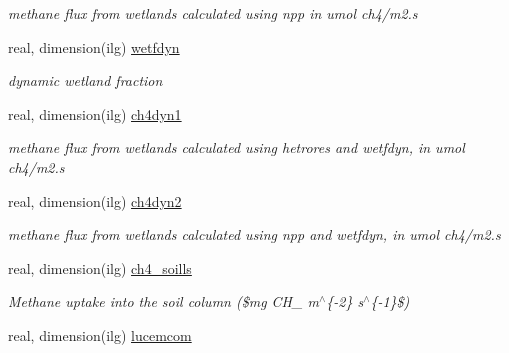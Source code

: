 \begin{DoxyCompactItemize}
\begin{DoxyCompactList}\small\item\em methane flux from wetlands calculated using npp in umol ch4/m2.\+s \end{DoxyCompactList}\item 
\hypertarget{structctem__statevars_1_1veg__gat_aa371d75a56d8a9e4ae250ffab7cff1df}{}real, dimension(ilg) \hyperlink{structctem__statevars_1_1veg__gat_aa371d75a56d8a9e4ae250ffab7cff1df}{wetfdyn}\label{structctem__statevars_1_1veg__gat_aa371d75a56d8a9e4ae250ffab7cff1df}

\begin{DoxyCompactList}\small\item\em dynamic wetland fraction \end{DoxyCompactList}\item 
\hypertarget{structctem__statevars_1_1veg__gat_a2c95c640b44e0e3afd10638454ab032c}{}real, dimension(ilg) \hyperlink{structctem__statevars_1_1veg__gat_a2c95c640b44e0e3afd10638454ab032c}{ch4dyn1}\label{structctem__statevars_1_1veg__gat_a2c95c640b44e0e3afd10638454ab032c}

\begin{DoxyCompactList}\small\item\em methane flux from wetlands calculated using hetrores and wetfdyn, in umol ch4/m2.\+s \end{DoxyCompactList}\item 
\hypertarget{structctem__statevars_1_1veg__gat_a8ab31a0dda091dc520aa8894a1862e3c}{}real, dimension(ilg) \hyperlink{structctem__statevars_1_1veg__gat_a8ab31a0dda091dc520aa8894a1862e3c}{ch4dyn2}\label{structctem__statevars_1_1veg__gat_a8ab31a0dda091dc520aa8894a1862e3c}

\begin{DoxyCompactList}\small\item\em methane flux from wetlands calculated using npp and wetfdyn, in umol ch4/m2.\+s \end{DoxyCompactList}\item 
\hypertarget{structctem__statevars_1_1veg__gat_a259374843ce099eaf59dc64b6382f12f}{}real, dimension(ilg) \hyperlink{structctem__statevars_1_1veg__gat_a259374843ce099eaf59dc64b6382f12f}{ch4\+\_\+soills}\label{structctem__statevars_1_1veg__gat_a259374843ce099eaf59dc64b6382f12f}

\begin{DoxyCompactList}\small\item\em Methane uptake into the soil column (\$mg C\+H\+\_ m$^\wedge$\{-\/2\} s$^\wedge$\{-\/1\}\$) \end{DoxyCompactList}\item 
\hypertarget{structctem__statevars_1_1veg__gat_ad799ab71fe584963b0e5d7d2ae2cf41c}{}real, dimension(ilg) \hyperlink{structctem__statevars_1_1veg__gat_ad799ab71fe584963b0e5d7d2ae2cf41c}{lucemcom}\label{structctem__statevars_1_1veg__gat_ad799ab71fe584963b0e5d7d2ae2cf41c}


\end{DoxyCompactItemize}
